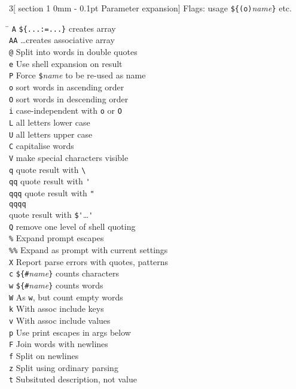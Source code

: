 \documentclass{article}
\makeatletter
\renewcommand{\section}{\@startsection
  {section}%
  {1}%
  {0mm}%
  {-\baselineskip}%
  {0.1pt}%
  {\normalfont\normalsize\scshape}} %
\newcommand\I[1]{\textsl{#1}}
\newcommand\T[1]{\texttt{#1}}
\makeatother
\begin{document}
\begin{multicols}{3}[\section{Parameter expansion}]
Flags:  usage \verb!${(o)!\I{name}\verb!}! etc.
\begin{tabbing}
\hskip 20pt \= \kill
\T{A}           \> \verb!${...:=...}! creates array \\
\T{AA}          \> \dots creates associative array \\
\verb!@!        \> Split into words in double quotes \\
\T{e}           \> Use shell expansion on result \\
\T{P}           \> Force \verb!$!\I{name} to be re-used as name \\
\T{o}           \> sort words in ascending order \\
\T{O}           \> sort words in descending order \\
\T{i}           \> case-independent with \T{o} or \T{O} \\
\T{L}           \> all letters lower case \\
\T{U}           \> all letters upper case \\
\T{C}           \> capitalise words \\
\T{V}           \> make special characters visible \\
\T{q}           \> quote result with \verb!\! \\
\T{qq}          \> quote result with \verb!'! \\
\T{qqq}         \> quote result with \verb!"! \\
\T{qqqq}        \\
                \> quote result with \verb!$'!\dots\verb!'! \\
\T{Q}           \> remove one level of shell quoting \\
\verb!%!        \> Expand prompt escapes \\
\verb!%%!       \> Expand as prompt with current settings \\
\T{X}           \> Report parse errors with quotes, patterns \\
\T{c}           \> \verb!${#!\I{name}\verb!}! counts characters \\
\T{w}           \> \verb!${#!\I{name}\verb!}! counts words \\
\T{W}           \> As \T{w}, but count empty words \\
\T{k}           \> With assoc include keys \\
\T{v}           \> With assoc include values \\
\T{p}           \> Use print escapes in args below \\
\T{F}           \> Join words with newlines \\
\T{f}           \> Split on newlines \\
\T{z}           \> Split using ordinary parsing \\
\T{t}           \> Subsituted description, not value \\
\end{tabbing}


\end{multicols}
\end{document}
